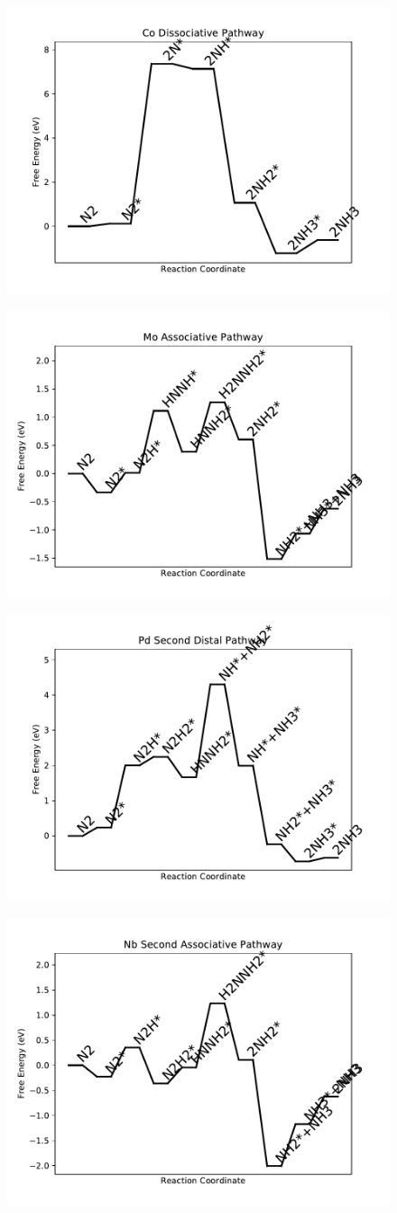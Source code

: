 \begin{figure}
\includegraphics[width=0.5\linewidth]{data/plots/Co_dissociative.pdf}
\label{fig:Co_dissociative}
\end{figure}

\begin{figure}
\includegraphics[width=0.5\linewidth]{data/plots/Mo_associative.pdf}
\label{fig:Mo_associative}
\end{figure}

\begin{figure}
\includegraphics[width=0.5\linewidth]{data/plots/Pd_distal_2.pdf}
\label{fig:Pd_distal_2}
\end{figure}

\begin{figure}
\includegraphics[width=0.5\linewidth]{data/plots/Nb_associative_2.pdf}
\label{fig:Nb_associative_2}
\end{figure}

